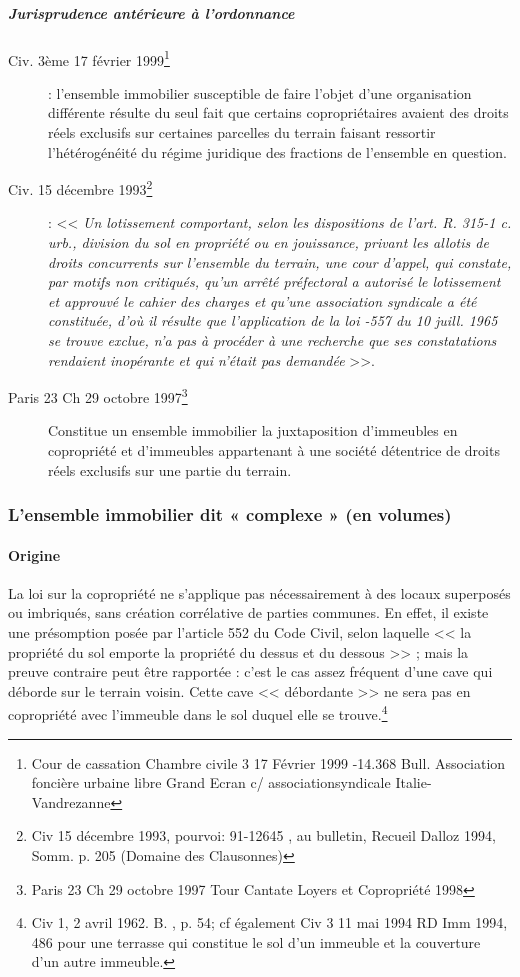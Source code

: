 		
			\subparagraph{Jurisprudence antérieure à l’ordonnance}
			\begin{description}
				\item[Civ. 3ème 17 février 1999\footnote{Cour de cassation Chambre civile 3 17 Février 1999 -14.368 Bull. Association foncière urbaine libre Grand Ecran c/ associationsyndicale Italie-Vandrezanne}] : l’ensemble immobilier susceptible de faire l’objet d’une organisation différente résulte du seul fait que certains copropriétaires avaient des droits réels exclusifs sur certaines parcelles du terrain faisant ressortir l’hétérogénéité du régime juridique des fractions de l’ensemble en question.
				
				\item[Civ. 15 décembre 1993\footnote{Civ 15 décembre 1993, pourvoi: 91-12645 , au bulletin, Recueil Dalloz 1994, Somm. p. 205 (Domaine des Clausonnes)}]	: << \textit{Un lotissement comportant, selon les dispositions de l'art. R. 315-1 c. urb., division du sol en propriété ou en jouissance, privant les allotis de droits concurrents sur l'ensemble du terrain, une cour d'appel, qui constate, par motifs non critiqués, qu'un arrêté préfectoral a autorisé le lotissement et approuvé le cahier des charges et qu'une association syndicale a été constituée, d'où il résulte que l'application de la loi -557 du 10 juill. 1965 se trouve exclue, n'a pas à procéder à une recherche que ses constatations rendaient inopérante et qui n'était pas demandée} >>.
			
				\item[Paris 23\degre{} Ch 29 octobre 1997\footnote{Paris 23\degre{} Ch 29 octobre 1997 Tour Cantate Loyers et Copropriété 1998 }] Constitue un ensemble immobilier la juxtaposition d’immeubles en copropriété et d’immeubles	appartenant à une société détentrice de droits réels exclusifs sur une partie du terrain.
			\end{description}
		
		\subsubsection{L’ensemble immobilier dit « complexe » (en volumes)}
		
			\paragraph{Origine}
			
				La loi sur la copropriété ne s'applique pas nécessairement à des locaux superposés ou imbriqués, sans
				création corrélative de parties communes.
				En effet, il existe une présomption posée par l'article 552 du Code Civil, selon laquelle << la propriété du sol
				emporte la propriété du dessus et du dessous >> ; mais la preuve contraire peut être rapportée : c'est le cas
				assez fréquent d'une cave qui déborde sur le terrain voisin. Cette cave << débordante >> ne sera pas en
				copropriété avec l'immeuble dans le sol duquel elle se trouve.\footnote{
				Civ 1\degre{}, 2 avril 1962. B. , p. 54; cf également Civ 3\degre{} 11 mai 1994 RD Imm 1994, 486 pour une terrasse qui constitue
				le sol d'un immeuble et la couverture d'un autre immeuble.}
				
